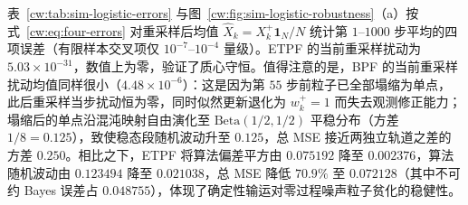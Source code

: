 表~\ref{cw:tab:sim-logistic-errors} 与图~\ref{cw:fig:sim-logistic-robustness}（a）按式~\eqref{cw:eq:four-errors} 对重采样后均值 $\hat X_k=X_k^+\mathbf1_N/N$ 统计第 $1$--$1000$ 步平均的四项误差（有限样本交叉项仅 $10^{-7}$--$10^{-4}$ 量级）。ETPF 的当前重采样扰动为 $5.03\times 10^{-31}$，数值上为零，验证了质心守恒。值得注意的是，BPF 的当前重采样扰动均值同样很小（$4.48\times 10^{-6}$）：这是因为第 $55$ 步前粒子已全部塌缩为单点，此后重采样当步扰动恒为零，同时似然更新退化为 $w_k^+=1$ 而失去观测修正能力；塌缩后的单点沿混沌映射自由演化至 $\mathrm{Beta}(1/2,1/2)$ 平稳分布（方差 $1/8=0.125$），致使稳态段随机波动升至 $0.125$，总 MSE 接近两独立轨道之差的方差 $0.250$。相比之下，ETPF 将算法偏差平方由 $0.075192$ 降至 $0.002376$，算法随机波动由 $0.123494$ 降至 $0.021038$，总 MSE 降低 $70.9\%$ 至 $0.072128$（其中不可约 Bayes 误差占 $0.048755$），体现了确定性输运对零过程噪声粒子贫化的稳健性。
